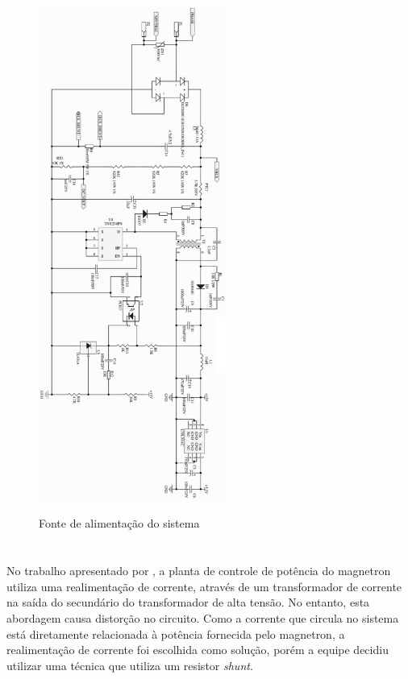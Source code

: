 \begin{figure}[H]
   \centering
   \caption{Fonte de alimentação do sistema}
    \includegraphics[width=0.55\textwidth]{./dados/figuras/proj-font-alim}
    \label{fig:proj-font-alim}
\end{figure}

\pagebreak


\section{}
\label{sec:shunt}
No trabalho apresentado por , a planta de controle de potência do magnetron utiliza uma realimentação de corrente, através de um transformador de corrente na saída do secundário do transformador de alta tensão. No entanto, esta abordagem causa distorção no circuito. Como a corrente que circula no sistema está diretamente relacionada à potência fornecida pelo magnetron, a realimentação de corrente foi escolhida como solução, porém a equipe decidiu utilizar uma técnica que utiliza um resistor \textit{shunt}.


